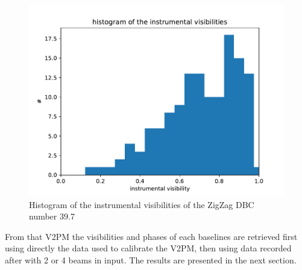 \begin{figure}[htbp!]
 \centering
 \includegraphics[scale=.5]{../picture/hist.pdf}
 \caption{Histogram of the instrumental visibilities of the ZigZag DBC number 39.7}
 \label{fig:hist}
\end{figure}


From that V2PM the visibilities and phases of each baselines are retrieved first using directly the data used to calibrate the V2PM, then using data recorded after with 2 or 4 beams in input. The results are presented in the next section. 


